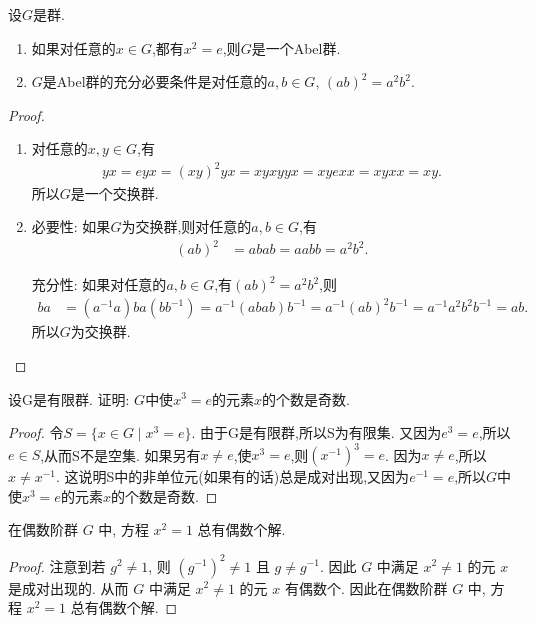 \documentclass[../../main.tex]{subfiles}%
\begin{document}
\begin{proposition}
设$G$是群. 
\begin{enumerate}[(1)]
\item 如果对任意的$x \in G$,都有$x^2 = e$,则$G$是一个Abel群.

\item $G$是Abel群的充分必要条件是对任意的$a,b \in G$, $(ab)^2 = a^2 b^2$.
\end{enumerate}
\end{proposition}
\begin{proof}
\begin{enumerate}[(1)]
\item 对任意的$x,y \in G$,有
\begin{align*}
yx = eyx = (xy)^2 yx = xyxyyx = xyexx = xyxx = xy.
\end{align*}
所以$G$是一个交换群.

\item {\heiti 必要性:} 如果$G$为交换群,则对任意的$a,b \in G$,有
\begin{align*}
(ab)^2 &= abab = aabb = a^2 b^2.
\end{align*}

{\heiti 充分性:} 如果对任意的$a,b \in G$,有$(ab)^2 = a^2 b^2$,则
\begin{align*}
ba &= (a^{-1}a)ba(bb^{-1}) = a^{-1}(abab)b^{-1} = a^{-1}(ab)^2 b^{-1} = a^{-1}a^2 b^2 b^{-1} = ab.
\end{align*}
所以$G$为交换群.
\end{enumerate}

\end{proof}

\begin{example}
设G是有限群. 证明: $G$中使$x^3 = e$的元素$x$的个数是奇数.
\end{example}
\begin{proof}

令$S = \{x \in G \mid x^3 = e\}$. 由于G是有限群,所以S为有限集. 又因为$e^3 = e$,所以$e \in S$,从而S不是空集. 如果另有$x \neq e$,使$x^3 = e$,则$(x^{-1})^3 = e$. 因为$x \neq e$,所以$x \neq x^{-1}$. 这说明S中的非单位元(如果有的话)总是成对出现,又因为$e^{-1} = e$,所以$G$中使$x^3 = e$的元素$x$的个数是奇数.

\end{proof}

\begin{example}
在偶数阶群 $G$ 中, 方程 $x^2=1$ 总有偶数个解.
\end{example}
\begin{proof}

注意到若 $g^2 \neq 1$, 则 $(g^{-1})^2 \neq 1$ 且 $g \neq g^{-1}$. 因此 $G$ 中满足 $x^2 \neq 1$ 的元 $x$ 是成对出现的. 从而 $G$ 中满足 $x^2 \neq 1$ 的元 $x$ 有偶数个. 因此在偶数阶群 $G$ 中, 方程 $x^2=1$ 总有偶数个解.

\end{proof}
\end{document}
